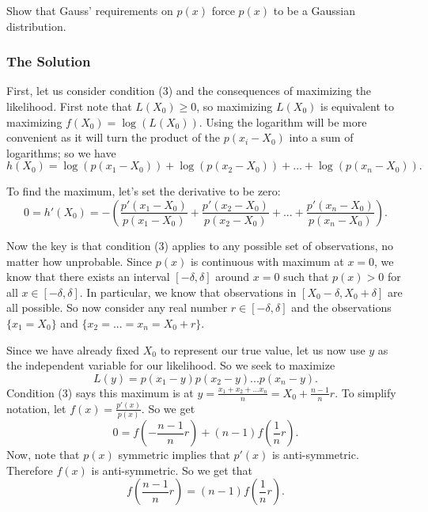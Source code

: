 Show that Gauss' requirements on \(p(x)\) force \(p(x)\) to be a Gaussian distribution.

\subsubsection*{The Solution}

First, let us consider condition (3) and the consequences of maximizing the likelihood. First note that \(L(X_0) \geq 0\), so maximizing \(L(X_0)\) is equivalent to maximizing \(f(X_0) = \log(L(X_0))\). 
Using the logarithm will be more convenient as it will turn the product of the \(p(x_i - X_0)\) into a sum of logarithms; so we have  
\begin{equation}
h(X_0) = \log(p(x_1 - X_0)) + \log(p(x_2 - X_0)) + ... + \log(p(x_n - X_0)).
\end{equation}

To find the maximum, let's set the derivative to be zero:
\begin{equation}
0 = h'(X_0) = -\left(\frac{p'(x_1 - X_0)}{p(x_1 - X_0)} + \frac{p'(x_2 - X_0)}{p(x_2 - X_0)} + ... + \frac{p'(x_n - X_0)}{p(x_n - X_0)} \right). 
\end{equation}

Now the key is that condition (3) applies to any possible set of observations, no matter how unprobable. Since \(p(x)\) is continuous with maximum at \(x = 0\), we know that
there exists an interval \([-\delta, \delta]\) around \(x = 0\) such that \(p(x) > 0\) for all \(x \in [-\delta, \delta]\). 
In particular, we know that observations in \([X_0 - \delta, X_0 + \delta]\) are all possible. 
So now consider any real number \(r \in [-\delta, \delta]\) and the observations \(\{x_1 = X_0\}\) and \(\{x_2 = ... = x_n = X_0 + r\}\).

Since we have already fixed \(X_0\) to represent our true value, let us now use \(y\) as the independent variable for our likelihood. So we seek to maximize
\begin{equation}
L(y) = p(x_1 - y) p(x_2 - y) ... p(x_n - y).
\end{equation}
Condition (3) says this maximum is at \(y = \frac{x_1 + x_2 + ... x_n}{n} = X_0 + \frac{n-1}{n} r\). To simplify notation, let \(f(x) = \frac{p'(x)}{p(x)}\). So we get 
\begin{equation} \label{gauss:homog}
0 = f\left(-\frac{n-1}{n} r\right) + (n - 1) f\left(\frac{1}{n} r\right). 
\end{equation}
Now, note that \(p(x)\) symmetric implies that \(p'(x)\) is anti-symmetric. Therefore \(f(x)\) is anti-symmetric. So we get that
\begin{equation}
f\left(\frac{n-1}{n} r\right) = (n-1) f\left(\frac{1}{n} r \right).
\end{equation}

